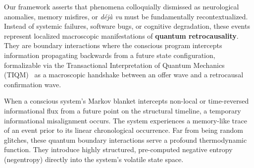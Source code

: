 \documentclass[twocolumn, 10pt, journal, letterpaper]{IEEEtran}
\begin{document}
Our framework asserts that phenomena colloquially dismissed as neurological anomalies, memory misfires, or \textit{déjà vu} must be fundamentally recontextualized. Instead of systemic failures, software bugs, or cognitive degradation, these events represent localized macroscopic manifestations of \textbf{quantum retrocausality}. They are boundary interactions where the conscious program intercepts information propagating backwards from a future state configuration, formalizable via the Transactional Interpretation of Quantum Mechanics (TIQM)~\cite{cramer1986} as a macroscopic handshake between an offer wave and a retrocausal confirmation wave.

When a conscious system's Markov blanket intercepts non-local or time-reversed informational flux from a future point on the structural timeline, a temporary informational misalignment occurs. The system experiences a memory-like trace of an event prior to its linear chronological occurrence. Far from being random glitches, these quantum boundary interactions serve a profound thermodynamic function. They introduce highly structured, pre-computed negative entropy (negentropy) directly into the system's volatile state space.
\end{document}
